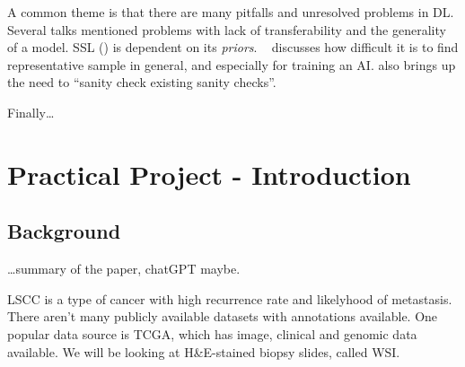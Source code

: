 \documentclass[10pt,twocolumn,letterpaper]{article}
\begin{document}
A common theme is that there are many pitfalls and unresolved problems in \gls{DL}. Several talks mentioned problems with lack of transferability and the generality of a model. \gls{SSL} () is dependent on its \textit{priors}. ~ discusses how difficult it is to find representative sample in general, and especially for training an \gls{AI}.  also brings up the need to ``sanity check existing sanity checks''.


Finally\dots{}

\newpage

\section{Practical Project - Introduction}

\subsection{Background}
\dots{}summary of the paper, chatGPT maybe.



\gls{LSCC} is a type of cancer with high recurrence rate and likelyhood of metastasis. There aren't many publicly available datasets with annotations available. One popular data source is \gls{TCGA}, which has image, clinical and genomic data available. We will be looking at H\&E-stained biopsy slides, called \gls{WSI}.
\end{document}
